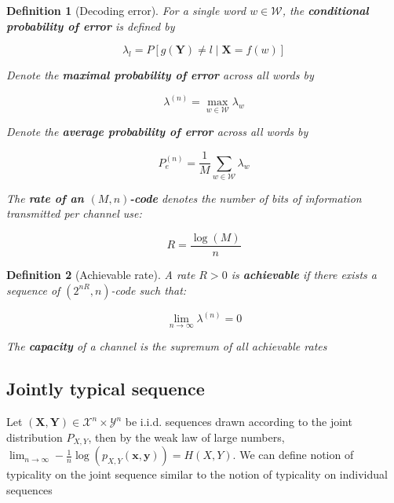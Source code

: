 \documentclass{article}
\newtheorem{definition}{Definition}[section]
\begin{document}
    \begin{definition}[Decoding error]
        For a single word $w \in \mathcal{W}$, the \textbf{conditional probability of error} is defined by

        \begin{equation*}
            \lambda_l = P[g(\mathbf{Y}) \neq l \mid \mathbf{X} = f(w)]
        \end{equation*}

        Denote the \textbf{maximal probability of error} across all words by

        \begin{equation*}
            \lambda^(n) = \max_{w \in \mathcal{W}} \lambda_w
        \end{equation*}

        Denote the \textbf{average probability of error} across all words by

        \begin{equation*}
            P_e^{(n)} = \frac{1}{M}\sum_{w \in \mathcal{W}}\lambda_w
        \end{equation*}

        The \textbf{rate of an $(M, n)$-code} denotes the number of bits of information transmitted per channel use:

        \begin{equation*}
            R = \frac{\log(M)}{n}
        \end{equation*}
    \end{definition}

    \begin{definition}[Achievable rate]
        A rate $R > 0$ is \textbf{achievable} if there exists a sequence of $(2^{nR}, n)$-code such that:

        \begin{equation*}
            \lim_{n \rightarrow \infty}\lambda^{(n)} = 0
        \end{equation*}

        The \textbf{capacity} of a channel is the supremum of all achievable rates
    \end{definition}

    \subsection{Jointly typical sequence}
    Let $(\mathbf{X}, \mathbf{Y}) \in \mathcal{X}^n \times \mathcal{Y}^n$ be i.i.d. sequences drawn according to the joint distribution $P_{X, Y}$, then by the weak law of large numbers, $\lim_{n \rightarrow \infty}-\frac{1}{n}\log(p_{X, Y}(\mathbf{x}, \mathbf{y})) = H(X, Y)$. We can define notion of typicality on the joint sequence similar to the notion of typicality on individual sequences
\end{document}

